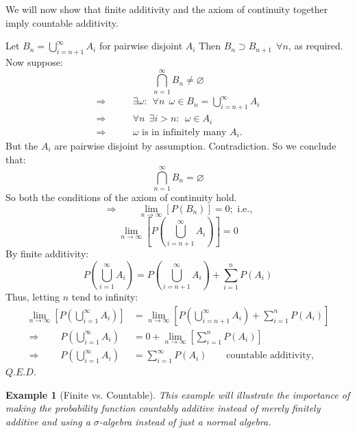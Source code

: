 \documentclass[12pt,a4paper]{article}
\newtheorem{ex}[thm]{Example}
\begin{document}
We will now show that finite additivity and the axiom of continuity together imply countable additivity.\par
Let $B_n=\bigcup_{i=n+1}^{\infty}A_i$ for pairwise disjoint $A_i$ Then $B_{n}\supset B_{n+1}\:\:\forall n$, as required. Now suppose:
$$\bigcap_{n=1}^{\infty}B_n\neq\varnothing$$
\begin{align*}
\Rightarrow&\qquad\exists\omega :\:\:\forall n\:\:\omega\in B_n=\bigcup_{i=n+1}^{\infty}A_i\\
\Rightarrow&\qquad\forall n\:\:\exists i>n:\:\:\omega\in A_i\\
\Rightarrow&\qquad\omega \text{ is in infinitely many }A_i.
\end{align*}
But the $A_i$ are pairwise disjoint by assumption. Contradiction. So we conclude that:
$$\bigcap_{n=1}^{\infty}B_n =\varnothing$$
So both the conditions of the axiom of continuity hold.
$$\Rightarrow\qquad \lim_{n\rightarrow\infty}[P(B_n)]=0;\text{ i.e.,}$$
$$\lim_{n\rightarrow\infty}[P(\bigcup_{i=n+1}^{\infty}A_i)]=0$$
By finite additivity:
$$P(\bigcup_{i=1}^{\infty}A_i) = P(\bigcup_{i=n+1}^{\infty}A_i) + \sum_{i=1}^{n}P(A_i)$$
Thus, letting $n$ tend to infinity:
\begin{align*}
\lim_{n\rightarrow\infty}[P(\bigcup_{i=1}^{\infty}A_i)] &= \lim_{n\rightarrow\infty}[P(\bigcup_{i=n+1}^{\infty}A_i) + \sum_{i=1}^{n}P(A_i)] \\
\Rightarrow\qquad P(\bigcup_{i=1}^{\infty}A_i) &= 0 + \lim_{n\rightarrow\infty}[\sum_{i=1}^{n}P(A_i)] \\
\Rightarrow\qquad P(\bigcup_{i=1}^{\infty}A_i) &= \sum_{i=1}^{\infty}P(A_i)\qquad\text{countable additivity,}
\end{align*}\hfill $Q.E.D.$

\begin{ex}[Finite vs. Countable]

This example will illustrate the importance of making the probability function countably additive instead of merely finitely additive and using a $\sigma$-algebra instead of just a normal algebra.
\end{ex}
\end{document}
